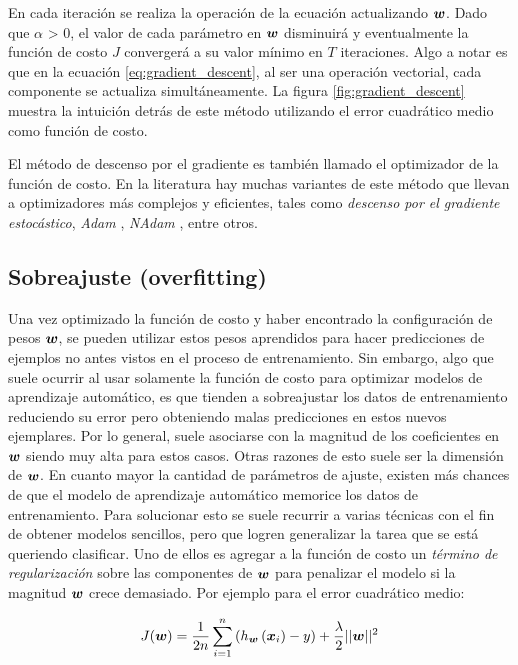 En cada iteración se realiza la operación de la ecuación actualizando
$\boldsymbol{w}$. Dado que $\alpha$ > 0, el valor de cada parámetro en $\boldsymbol{w}$
disminuirá y eventualmente la función de costo $J$ convergerá a su valor mínimo
en $T$ iteraciones. Algo a notar es que en la ecuación \ref{eq:gradient_descent},
al ser una operación vectorial, cada componente se actualiza simultáneamente. La
figura \ref{fig:gradient_descent} muestra la intuición detrás de este método
utilizando el error cuadrático medio como función de costo.

El método de descenso por el gradiente es también llamado el optimizador de la
función de costo. En la literatura hay muchas variantes de este método que
llevan a optimizadores más complejos y eficientes, tales como \emph{descenso por
el gradiente estocástico}\citep{Kiefer-1952}, \emph{Adam} \citep{kingma-adam-2017}, \emph{NAdam}
\citep{zhang-2018}, entre otros.

\subsection{Sobreajuste (overfitting)}

Una vez optimizado la función de costo y haber encontrado la configuración de
pesos $\boldsymbol{w}$, se pueden utilizar estos pesos aprendidos para hacer
predicciones de ejemplos no antes vistos en el proceso de entrenamiento. Sin
embargo, algo que suele ocurrir al usar solamente la función de costo para
optimizar modelos de aprendizaje automático, es que tienden a sobreajustar los
datos de entrenamiento reduciendo su error pero obteniendo malas predicciones en
estos nuevos ejemplares. Por lo general, suele asociarse con la magnitud de los
coeficientes en $\boldsymbol{w}$ siendo muy alta para estos casos. Otras razones de
esto suele ser la dimensión de $\boldsymbol{w}$. En cuanto mayor la cantidad de
parámetros de ajuste, existen más chances de que el modelo de aprendizaje
automático memorice los datos de entrenamiento. Para solucionar esto se suele
recurrir a varias técnicas con el fin de obtener modelos sencillos, pero que
logren generalizar la tarea que se está queriendo clasificar. Uno de ellos es
agregar a la función de costo un \emph{término de regularización} sobre las
componentes de $\boldsymbol{w}$ para penalizar el modelo si la magnitud $\boldsymbol{w}$
crece demasiado. Por ejemplo para el error cuadrático medio:

\begin{align}
    J(\boldsymbol{w}) = \frac{1}{2n} \sum_{i=1}^{n}\left( h_{\boldsymbol{w}}\left( \boldsymbol{x}_{i}\right) - y \right) +
                  \frac{\lambda}{2} ||\boldsymbol{w}||^{2}
\end{align}

